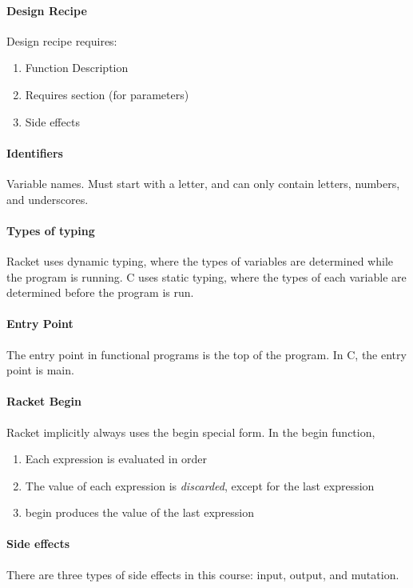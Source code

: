 \documentclass[10pt,letter]{article}
\begin{document}
\paragraph{Design Recipe} Design recipe requires: \begin{enumerate}
    \item Function Description
    \item Requires section (for parameters)
    \item Side effects
\end{enumerate}

\paragraph{Identifiers} Variable names. Must start with a letter, and can only contain letters, numbers, and underscores.

\paragraph{Types of typing} Racket uses dynamic typing, where the types of variables are determined while the program is running. C uses static typing, where the types of each variable are determined before the program is run. 

\paragraph{Entry Point} The entry point in functional programs is the top of the program. In C, the entry point is main.

\paragraph{Racket Begin} Racket implicitly always uses the begin special form. In the begin function, \begin{enumerate}
    \item Each expression is evaluated in order
    \item The value of each expression is \textit{discarded}, except for the last expression
    \item begin produces the value of the last expression
\end{enumerate}

\paragraph{Side effects} There are three types of side effects in this course: input, output, and mutation. 
\end{document}
